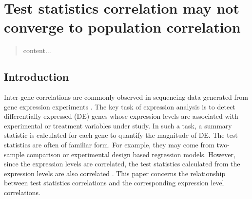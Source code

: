 \section{Test statistics correlation may not converge to population correlation}\label{chap2}

	\begin{abstract}
		content...
	\end{abstract}

	\subsection{Introduction}
	
	Inter-gene correlations are commonly observed in sequencing data generated from gene expression 
	experiments \citep{efron2012large1, qiu2005effects,storey2003positive, huang2013gene, 
		gatti2010heading}.
	The key task of expression analysis is to detect differentially expressed (DE) genes whose 
	expression levels are associated with experimental or treatment variables under study. 
	In such a task, 
	a summary statistic is calculated for each gene to quantify the magnitude of DE. The test 
	statistics are often of familiar form. For example, 
	they may come from two-sample comparison or experimental design based regression models. 
	However, since the expression levels are correlated, the test statistics calculated from the 
	expression levels are also correlated \citep{barry2008statistical, efron2007correlation, 
		wu2012camera}. This paper concerns the relationship between test 
	statistics correlations and the corresponding expression level correlations.
	
